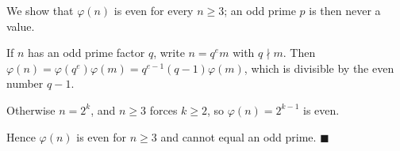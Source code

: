 We show that $\varphi(n)$ is even for every $n\ge3$; an odd prime $p$ is then never a value.

If $n$ has an odd prime factor $q$, write $n=q^em$ with $q\nmid m$. Then $\varphi(n)=\varphi\left(q^e\right)\varphi(m)=q^{e-1}(q-1)\varphi(m)$, which is divisible by the even number $q-1$.

Otherwise $n=2^k$, and $n\ge3$ forces $k\ge2$, so $\varphi(n)=2^{k-1}$ is even.

Hence $\varphi(n)$ is even for $n\ge3$ and cannot equal an odd prime. $\blacksquare$
